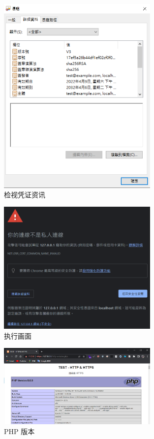 \begin{figure}[htb]
\centering 
\includegraphics[width=0.70\textwidth]{img/ch1s2m13.png} 
\caption{检视凭证资讯}
\label{Test}
\end{figure}

\begin{figure}[htb]
\centering 
\includegraphics[width=0.70\textwidth]{img/ch1s2m14.png} 
\caption{执行画面}
\label{Test}
\end{figure}

\begin{figure}[htb]
\centering 
\includegraphics[width=0.70\textwidth]{img/ch1s2m15.png} 
\caption{PHP 版本}
\label{Test}
\end{figure}

